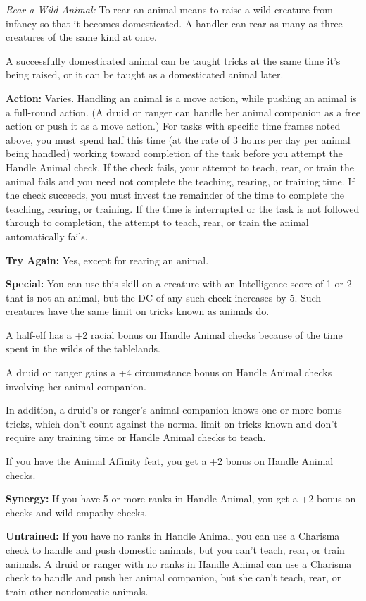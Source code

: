 \textit{Rear a Wild Animal:} To rear an animal means to raise a wild creature from infancy so that it becomes domesticated. A handler can rear as many as three creatures of the same kind at once.

A successfully domesticated animal can be taught tricks at the same time it's being raised, or it can be taught as a domesticated animal later.

\textbf{Action:} Varies. Handling an animal is a move action, while pushing an animal is a full-round action. (A druid or ranger can handle her animal companion as a free action or push it as a move action.) For tasks with specific time frames noted above, you must spend half this time (at the rate of 3 hours per day per animal being handled) working toward completion of the task before you attempt the Handle Animal check. If the check fails, your attempt to teach, rear, or train the animal fails and you need not complete the teaching, rearing, or training time. If the check succeeds, you must invest the remainder of the time to complete the teaching, rearing, or training. If the time is interrupted or the task is not followed through to completion, the attempt to teach, rear, or train the animal automatically fails.

\textbf{Try Again:} Yes, except for rearing an animal.

\textbf{Special:} You can use this skill on a creature with an Intelligence score of 1 or 2 that is not an animal, but the DC of any such check increases by 5. Such creatures have the same limit on tricks known as animals do.

A half-elf has a +2 racial bonus on Handle Animal checks because of the time spent in the wilds of the tablelands.

A druid or ranger gains a +4 circumstance bonus on Handle Animal checks involving her animal companion.

In addition, a druid's or ranger's animal companion knows one or more bonus tricks, which don't count against the normal limit on tricks known and don't require any training time or Handle Animal checks to teach.

If you have the Animal Affinity feat, you get a +2 bonus on Handle Animal checks.

\textbf{Synergy:} If you have 5 or more ranks in Handle Animal, you get a +2 bonus on  checks and wild empathy checks.

\textbf{Untrained:} If you have no ranks in Handle Animal, you can use a Charisma check to handle and push domestic animals, but you can't teach, rear, or train animals. A druid or ranger with no ranks in Handle Animal can use a Charisma check to handle and push her animal companion, but she can't teach, rear, or train other nondomestic animals.


